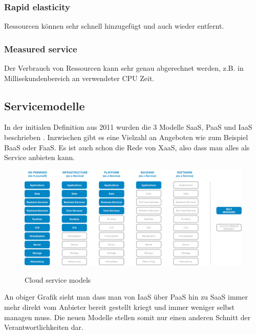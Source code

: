 \documentclass[12pt, a4paper]{article}
\begin{document}
\subsubsection{Rapid elasticity}
Ressourcen können sehr schnell hinzugefügt und auch wieder entfernt.

\subsubsection{Measured service}
Der Verbrauch von Ressourcen kann sehr genau abgerechnet werden, z.B. in Millisekundenbereich an verwendeter CPU Zeit.

\subsection{Servicemodelle}
In der initialen Definition aus 2011 wurden die 3 Modelle \ac{SaaS}, \ac{PaaS} und \ac{IaaS} beschrieben \cite{mell2011nist}. Inzwischen gibt es eine Vielzahl an Angeboten wie zum Beispiel \ac{BaaS} oder \ac{FaaS}. Es ist auch schon die Rede von \ac{XaaS}, also dass man alles als Service anbieten kann.
\begin{figure}
    \includegraphics[width=\textwidth, height=\textheight,keepaspectratio]{cloud_service_models.png}
    \caption{Cloud service models}
    \cite{serverless2017roewekamp}
\end{figure}
An obiger Grafik sieht man dass man von \ac{IaaS} über \ac{PaaS} hin zu \ac{SaaS} immer mehr direkt vom Anbieter bereit gestellt kriegt und immer weniger selbst managen muss.
Die neuen Modelle stellen somit nur einen anderen Schnitt der Verantwortlichkeiten dar.
\end{document}
